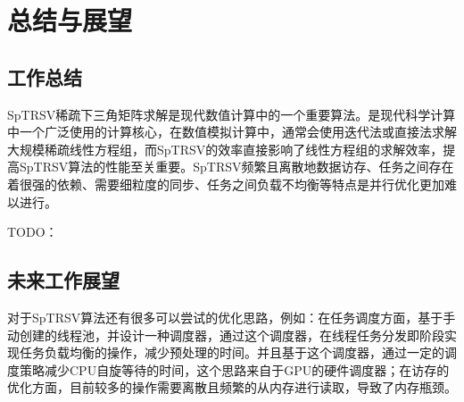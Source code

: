 \chapter{总结与展望}


\section{工作总结}

SpTRSV稀疏下三角矩阵求解是现代数值计算中的一个重要算法。是现代科学计算中一个广泛使用的计算核心，在数值模拟计算中，通常会使用迭代法或直接法求解大规模稀疏线性方程组，而SpTRSV的效率直接影响了线性方程组的求解效率，提高SpTRSV算法的性能至关重要。SpTRSV频繁且离散地数据访存、任务之间存在着很强的依赖、需要细粒度的同步、任务之间负载不均衡等特点是并行优化更加难以进行。

TODO：



\section{未来工作展望}

对于SpTRSV算法还有很多可以尝试的优化思路，例如：在任务调度方面，基于手动创建的线程池，并设计一种调度器，通过这个调度器，在线程任务分发即阶段实现任务负载均衡的操作，减少预处理的时间。并且基于这个调度器，通过一定的调度策略减少CPU自旋等待的时间，这个思路来自于GPU的硬件调度器；在访存的优化方面，目前较多的操作需要离散且频繁的从内存进行读取，导致了内存瓶颈。

\endinput